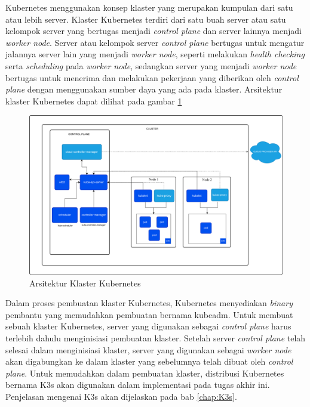 Kubernetes menggunakan konsep klaster yang merupakan kumpulan dari satu atau
lebih server. Klaster Kubernetes terdiri dari satu buah server atau satu kelompok server yang
bertugas menjadi \emph{control plane} dan server lainnya menjadi \emph{worker node}.
Server atau kelompok server \emph{control plane} bertugas untuk mengatur jalannya
server lain yang menjadi \emph{worker node}, seperti melakukan \emph{health checking} serta
\emph{scheduling} pada \emph{worker node}, sedangkan server yang menjadi \emph{worker node}
bertugas untuk menerima dan melakukan pekerjaan yang diberikan oleh \emph{control plane}
dengan menggunakan sumber daya yang ada pada klaster. Arsitektur
klaster Kubernetes dapat dilihat pada gambar \ref{fig:arsitektur-cluster-kubernetes}

\begin{figure}[H]
  \centering

  \includegraphics[scale=0.15]{gambar/kubernetes-cluster-architecture.png}

  \caption{Arsitektur Klaster Kubernetes}
  \label{fig:arsitektur-cluster-kubernetes}
\end{figure}

Dalam proses pembuatan klaster Kubernetes, Kubernetes menyediakan \emph{binary} pembantu
yang memudahkan pembuatan bernama kubeadm. Untuk membuat sebuah klaster Kubernetes,
server yang digunakan sebagai \emph{control plane} harus terlebih dahulu menginisiasi
pembuatan klaster. Setelah server \emph{control plane} telah selesai dalam menginisiasi klaster,
server yang digunakan sebagai \emph{worker node} akan digabungkan ke dalam klaster yang sebelumnya
telah dibuat oleh \emph{control plane}. Untuk memudahkan dalam pembuatan klaster, distribusi
Kubernetes bernama K3s akan digunakan dalam implementasi pada tugas akhir ini. Penjelasan
mengenai K3s akan dijelaskan pada bab \ref{chap:K3s}.

